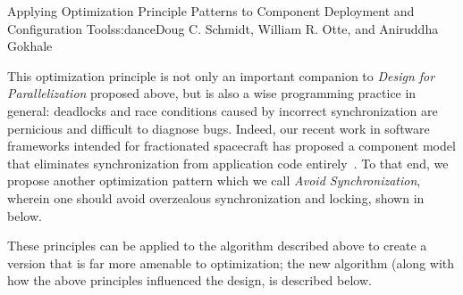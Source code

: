 \begin{aosachapter}{Applying Optimization Principle Patterns to Component Deployment and
                    Configuration Tools}{s:dance}{Doug C. Schmidt, William R. Otte, and Aniruddha Gokhale}
\begin{aosaitemize}
  This optimization principle is not only an important companion to
  \emph{Design for Parallelization} proposed above, but is also a wise
  programming practice in general: deadlocks and race conditions caused
  by incorrect synchronization are pernicious and difficult to diagnose
  bugs. Indeed, our recent work in software frameworks intended for
  fractionated spacecraft has proposed a component model that eliminates
  synchronization from application code
  entirely~\cite{GokhaleF6Aerospace:12}. To that end, we propose
  another optimization pattern which we call \emph{Avoid
  Synchronization}, wherein one should avoid overzealous synchronization
  and locking, shown in  below.
\end{aosaitemize}

These principles can be applied to the algorithm described above to
create a version that is far more amenable to optimization; the new
algorithm (along with how the above principles influenced the design, is
described below.


\end{aosachapter}

